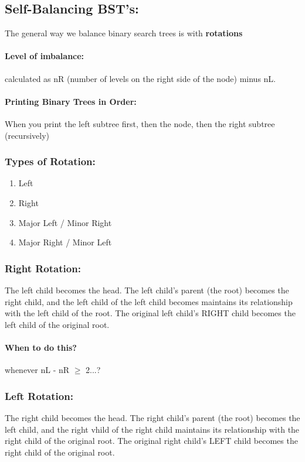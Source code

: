 \documentclass[a4paper,12pt]{article}
\begin{document}
\subsection{Self-Balancing BST's: }
The general way we balance binary search trees is with \textbf{rotations}
\paragraph{Level of imbalance: } calculated as nR (number of levels on the right side of the node) minus nL.
\paragraph{Printing Binary Trees in Order: } When you print the left subtree first, then the node, then the right subtree (recursively)
\subsubsection{Types of Rotation: }
\begin{enumerate}
\item Left
\item Right
\item Major Left / Minor Right
\item Major Right / Minor Left
\end{enumerate}

\subsubsection{Right Rotation: }
The left child becomes the head. The left child's parent (the root) becomes the right child, and the left child of the left child becomes maintains its relationship with the left child of the root. The original left child's RIGHT child becomes the left child of the original root. 
\paragraph{When to do this? } whenever nL - nR $\geq$ 2...?

\subsubsection{Left Rotation: }
The right child becomes the head. The right child's parent (the root) becomes the left child, and the right vhild of the right child maintains its relationship with the right child of the original root. The original right child's LEFT child becomes the right child of the original root. 
\end{document}
